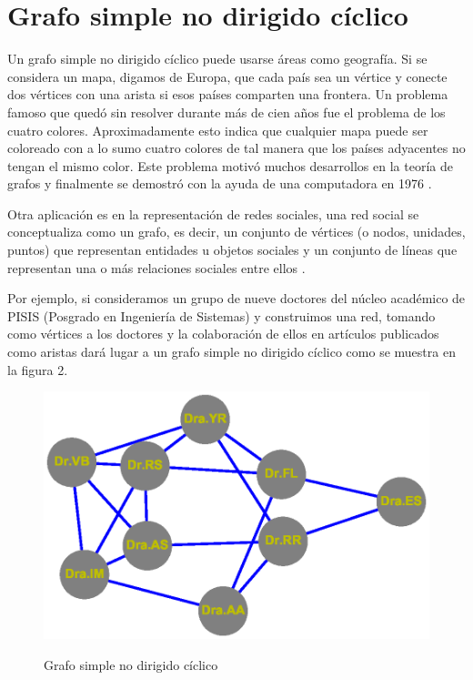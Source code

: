 \documentclass{article}
\begin{document}
\section{Grafo simple no dirigido cíclico}

Un grafo simple no dirigido cíclico puede usarse áreas como geografía. Si se considera un mapa, digamos de Europa, que cada país sea un vértice y conecte dos vértices con una arista si esos países comparten una frontera. Un problema famoso que quedó sin resolver durante más de cien años fue el problema de los cuatro colores. Aproximadamente esto indica que cualquier mapa puede ser coloreado con a lo sumo cuatro colores de tal manera que los países adyacentes no tengan el mismo color. Este problema motivó muchos desarrollos en la teoría de grafos y finalmente se demostró con la ayuda de una computadora en 1976 \cite{rf1}.

Otra aplicación es en la representación de redes sociales, una red social se conceptualiza como un grafo, es decir, un conjunto de vértices (o nodos, unidades, puntos) que representan entidades u objetos sociales y un conjunto de líneas que representan una o más relaciones sociales entre ellos \cite{article1}.

Por ejemplo, si consideramos un grupo de nueve doctores del núcleo académico de PISIS (Posgrado en Ingeniería de Sistemas) y construimos una red, tomando como vértices a los doctores y la colaboración de ellos en artículos publicados como aristas dará lugar a un grafo simple no dirigido cíclico como se muestra en la figura 2.

    
\begin{center}

\end{center}
\begin{figure}[h]
\begin{center}
\includegraphics[scale=0.7]{Graf2.eps}\\
\caption{Grafo simple no dirigido cíclico}
\end{center}

\end{figure}
\end{document}
